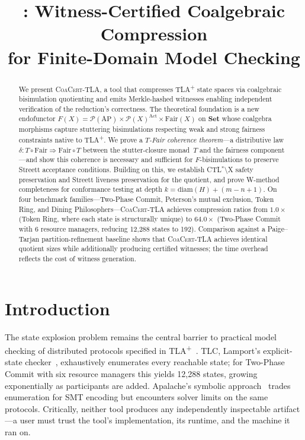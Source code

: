 \documentclass[11pt]{article}
\title{\CoaCert{}: Witness-Certified Coalgebraic Compression\\for Finite-Domain \TLAplus{} Model Checking}
\date{}
\newcommand{\Set}{\mathbf{Set}}
\newcommand{\Pow}{\mathcal{P}}
\newcommand{\Fair}{\ensuremath{\mathrm{Fair}}}
\newcommand{\Act}{\ensuremath{\mathrm{Act}}}
\newcommand{\AP}{\ensuremath{\mathrm{AP}}}
\newcommand{\TFair}{$T$-Fair}
\newcommand{\CoaCert}{\textsc{CoaCert-TLA}}
\newcommand{\TLAplus}{TLA\textsuperscript{+}}
\newcommand{\diam}{\ensuremath{\mathrm{diam}}}
\begin{document}
\maketitle

\begin{abstract}
We present \CoaCert{}, a tool that compresses \TLAplus{} state spaces via
coalgebraic bisimulation quotienting and emits Merkle-hashed witnesses
enabling independent verification of the reduction's correctness.
The theoretical foundation is a new endofunctor
$F(X) = \Pow(\AP) \times \Pow(X)^{\Act} \times \Fair(X)$
on $\Set$ whose coalgebra morphisms capture stuttering bisimulations
respecting weak and strong fairness constraints native to \TLAplus{}.
We prove a \emph{\TFair{} coherence theorem}---a distributive law
$\delta : T \circ \Fair \Rightarrow \Fair \circ T$ between the
stutter-closure monad~$T$ and the fairness component---and show this
coherence is necessary and sufficient for $F$-bisimulations to preserve
Streett acceptance conditions.
Building on this, we establish CTL$^*$$\setminus$X safety preservation
and Streett liveness preservation for the quotient, and prove W-method
completeness for conformance testing at depth
$k = \diam(H) + (m - n + 1)$.
On four benchmark families---Two-Phase Commit, Peterson's mutual
exclusion, Token Ring, and Dining Philosophers---\CoaCert{} achieves
compression ratios from $1.0\times$ (Token Ring, where each state is
structurally unique) to $64.0\times$ (Two-Phase Commit with 6 resource
managers, reducing 12{,}288 states to 192).
Comparison against a Paige--Tarjan partition-refinement baseline shows
that \CoaCert{} achieves identical quotient sizes while additionally
producing certified witnesses; the time overhead reflects the cost of
witness generation.
\end{abstract}

\section{Introduction}
\label{sec:intro}

The state explosion problem remains the central barrier to practical model
checking of distributed protocols specified in \TLAplus{}~\cite{Lamport02}.
TLC, Lamport's explicit-state checker~\cite{TLC}, exhaustively enumerates
every reachable state; for Two-Phase Commit with six resource managers this
yields 12{,}288 states, growing exponentially as participants are added.
Apalache's symbolic approach~\cite{Apalache} trades enumeration for SMT
encoding but encounters solver limits on the same protocols.
Critically, neither tool produces any independently inspectable
artifact---a user must trust the tool's implementation, its runtime, and
the machine it ran on.
\end{document}
